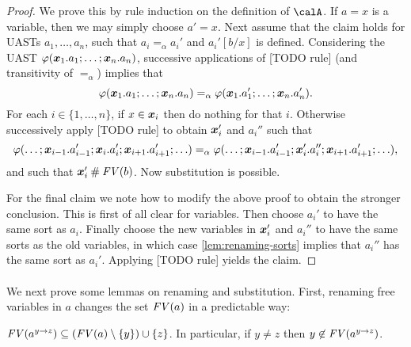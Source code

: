 \documentclass[a4paper, 11pt, article, danish, oneside]{memoir}
\DeclarePairedDelimiter{\auxdelimparen}{(}{)}
\newcommand*\union\cup
\renewcommand{\phi}{\varphi}
\newcommand{\newpar}{\paragraph{}}
\newcommand{\freevar}[2][]{\mathit{FV}\auxdelimparen[#1]{#2}}
\begin{document}
\begin{proof}
    We prove this by rule induction on the definition of $\calA$. If $a = x$ is a variable, then we may simply choose $a' = x$. Next assume that the claim holds for UASTs $a_1, \ldots, a_n$, such that $a_i =_\alpha a_i'$ and $a_i'[b/x]$ is defined. Considering the UAST $\phi(\seq{x}_1.a_1 ; \ldots ; \seq{x}_n.a_n)$, successive applications of [TODO rule] (and transitivity of $=_\alpha$) implies that
    \begin{equation*}
        \phi(\seq{x}_1.a_1 ; \ldots ; \seq{x}_n.a_n)
            =_\alpha \phi(\seq{x}_1.a_1' ; \ldots ; \seq{x}_n.a_n').
    \end{equation*}
    For each $i \in \{1, \ldots, n\}$, if $x \in \bm{x}_i$ then do nothing for that $i$. Otherwise successively apply [TODO rule] to obtain $\bm{x}_i'$ and $a_i''$ such that
    \begin{equation*}
        \phi( \ldots ; \seq{x}_{i-1}.a_{i-1}' ; \seq{x}_i.a_i' ; \seq{x}_{i+1}.a_{i+1}' ; \ldots )
            =_\alpha \phi( \ldots ; \seq{x}_{i-1}.a_{i-1}' ; \seq{x}_i'.a_i'' ; \seq{x}_{i+1}.a_{i+1}' ; \ldots ),
    \end{equation*}
    and such that $\seq{x}_i' \disj \freevar{b}$. Now substitution is possible.

    For the final claim we note how to modify the above proof to obtain the stronger conclusion. This is first of all clear for variables. Then choose $a_i'$ to have the same sort as $a_i$. Finally choose the new variables in $\bm{x}_i'$ and $a_i''$ to have the same sorts as the old variables, in which case \cref{lem:renaming-sorts} implies that $a_i''$ has the same sort as $a_i'$. Applying [TODO rule] yields the claim.
\end{proof}


\newpar

We next prove some lemmas on renaming and substitution. First, renaming free variables in $a$ changes the set $\freevar{a}$ in a predictable way:

\begin{lemma}
    \label{lem:renaming-freevars}
    $\freevar{a^{y \to z}} \subseteq (\freevar{a} \setminus \{y\}) \union \{z\}$. In particular, if $y \neq z$ then $y \not\in \freevar{a^{y \to z}}$.
\end{lemma}
\end{document}
